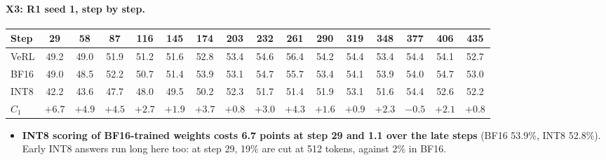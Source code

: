 \documentclass[11pt]{article}
\begin{document}
\paragraph{X3: R1 seed 1, step by step.}
\begin{center}\small\setlength{\tabcolsep}{2.5pt}
\begin{tabular}{@{}l *{15}{c}@{}}
\toprule
Step & 29 & 58 & 87 & 116 & 145 & 174 & 203 & 232 & 261 & 290 & 319 & 348 & 377 & 406 & 435\\
\midrule
VeRL & 49.2 & 49.0 & 51.9 & 51.2 & 51.6 & 52.8 & 53.4 & 54.6 & 56.4 & 54.2 & 54.4 & 53.4 & 54.4 & 54.1 & 52.7\\
BF16 & 49.0 & 48.5 & 52.2 & 50.7 & 51.4 & 53.9 & 53.1 & 54.7 & 55.7 & 53.4 & 54.1 & 53.9 & 54.0 & 54.7 & 53.0\\
INT8 & 42.2 & 43.6 & 47.7 & 48.0 & 49.5 & 50.2 & 52.3 & 51.7 & 51.4 & 51.9 & 53.1 & 51.6 & 54.4 & 52.6 & 52.2\\
$C_1$ & $+6.7$ & $+4.9$ & $+4.5$ & $+2.7$ & $+1.9$ & $+3.7$ & $+0.8$ & $+3.0$ & $+4.3$ & $+1.6$ & $+0.9$ & $+2.3$ & $-0.5$ & $+2.1$ & $+0.8$\\
\bottomrule
\end{tabular}
\end{center}
\begin{itemize}
\item \textbf{INT8 scoring of BF16-trained weights costs 6.7 points at step 29 and 1.1 over the late steps} (BF16 53.9\%, INT8 52.8\%). Early INT8 answers run long here too: at step 29, 19\% are cut at 512 tokens, against 2\% in BF16.
\end{itemize}
\end{document}
